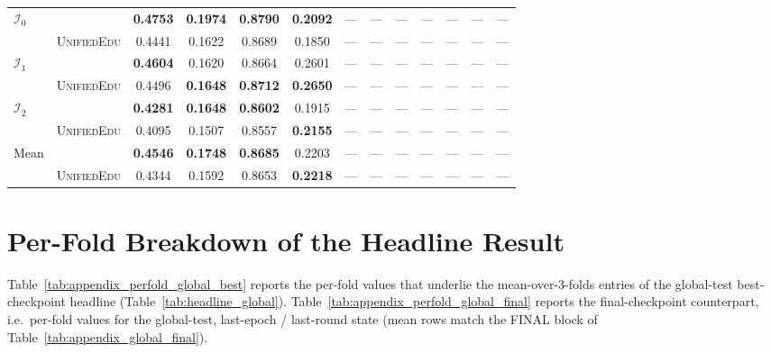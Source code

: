 \documentclass[11pt]{article}
\theoremstyle{plain}
\theoremstyle{definition}
\theoremstyle{remark}
\newcommand{\UniEdu}{\textsc{UnifiedEdu}}
\newcommand{\indiv}{\text{indiv}}
\begin{document}
\begin{table}[t]
\begin{tabular}{ll cccc ccccccc}
\midrule
\multirow{2}{*}{$\mathcal{I}_0$}
  & \indiv     & \textbf{0.4753} & \textbf{0.1974} & \textbf{0.8790} & \textbf{0.2092} & --- & --- & --- & --- & --- & --- & --- \\
  & \UniEdu{}  & 0.4441 & 0.1622 & 0.8689 & 0.1850 & --- & --- & --- & --- & --- & --- & --- \\
\multirow{2}{*}{$\mathcal{I}_1$}
  & \indiv     & \textbf{0.4604} & 0.1620 & 0.8664 & 0.2601 & --- & --- & --- & --- & --- & --- & --- \\
  & \UniEdu{}  & 0.4496 & \textbf{0.1648} & \textbf{0.8712} & \textbf{0.2650} & --- & --- & --- & --- & --- & --- & --- \\
\multirow{2}{*}{$\mathcal{I}_2$}
  & \indiv     & \textbf{0.4281} & \textbf{0.1648} & \textbf{0.8602} & 0.1915 & --- & --- & --- & --- & --- & --- & --- \\
  & \UniEdu{}  & 0.4095 & 0.1507 & 0.8557 & \textbf{0.2155} & --- & --- & --- & --- & --- & --- & --- \\
\multirow{2}{*}{Mean}
  & \indiv     & \textbf{0.4546} & \textbf{0.1748} & \textbf{0.8685} & 0.2203 & --- & --- & --- & --- & --- & --- & --- \\
  & \UniEdu{}  & 0.4344 & 0.1592 & 0.8653 & \textbf{0.2218} & --- & --- & --- & --- & --- & --- & --- \\
\bottomrule
\end{tabular}
\end{table}

\section{Per-Fold Breakdown of the Headline Result}
\label{app:perfold_global}

Table~\ref{tab:appendix_perfold_global_best} reports
the per-fold values that underlie the
mean-over-3-folds entries of the
global-test best-checkpoint headline
(Table~\ref{tab:headline_global}).
Table~\ref{tab:appendix_perfold_global_final} reports
the final-checkpoint counterpart, i.e.\ per-fold
values for the global-test, last-epoch / last-round
state (mean rows match the FINAL block of
Table~\ref{tab:appendix_global_final}).
\end{document}
